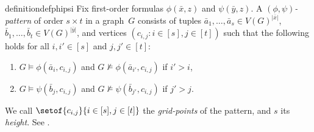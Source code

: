 \begin{restatable}{definition}{defphipsi}\label{def:phi-psi-patterns}
    Fix first-order formulas $\phi(\bar x,z)$ and $\psi(\bar y,z)$. A \emph{$(\phi,\psi)$-pattern} of order $s \times t$ in a graph~$G$ consists of tuples $\bar a_1, \ldots, \bar a_s \in V(G)^{|\bar x|}$, $\bar b_1, \ldots, \bar b_t \in V(G)^{|\bar y|}$, and vertices ${(c_{i,j}: i\in [s],j\in [t])}$ such that the following holds
    for all $i,i'\in [s]$ and $j,j'\in[t]$:
    \begin{enumerate}
        \item $G\models \phi(\bar a_i,c_{i,j})$
        and $G\not\models \phi(\bar a_{i'},c_{i,j})$ if $i'>i$,
        \item $G\models \psi(\bar b_j,c_{i,j})$
        and $G\not\models \psi(\bar b_{j'},c_{i,j})$ if $j'>j$.
    \end{enumerate}
\end{restatable}
\noindent We call $\setof{c_{i,j}}{i\in[s],j\in[t]}$ the \emph{grid-points} of the pattern, and $s$ its \emph{height}. See .
